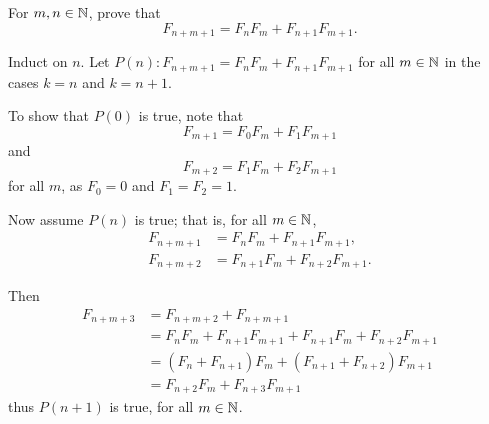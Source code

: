 \begin{exercise}
For $m,n\in\mathbb N$, prove that
\[ F_{n+m+1}=F_nF_m+F_{n+1}F_{m+1}. \]
\end{exercise}

\begin{solution}
Induct on $n$. Let $P(n):F_{n+m+1}=F_nF_m+F_{n+1}F_{m+1}$ for all $m\in\mathbb N$ in the cases $k=n$ and $k=n+1$.

To show that $P(0)$ is true, note that
\[ F_{m+1}=F_0F_m+F_1F_{m+1} \]
and
\[ F_{m+2}=F_1F_m+F_2F_{m+1} \]
for all $m$, as $F_0=0$ and $F_1=F_2=1$.

Now assume $P(n)$ is true; that is, for all $m\in\mathbb N$,
\begin{align*}
F_{n+m+1}&=F_nF_m+F_{n+1}F_{m+1},\\
F_{n+m+2}&=F_{n+1}F_m+F_{n+2}F_{m+1}.
\end{align*}

Then
\begin{align*}
F_{n+m+3}
&=F_{n+m+2}+F_{n+m+1}\\
&=F_n F_m+F_{n+1}F_{m+1}+F_{n+1}F_m+F_{n+2}F_{m+1}\\
&=(F_n+F_{n+1})F_m+(F_{n+1}+F_{n+2})F_{m+1}\\
&=F_{n+2}F_m+F_{n+3}F_{m+1}
\end{align*}
thus $P(n+1)$ is true, for all $m\in\mathbb N$.
\end{solution}